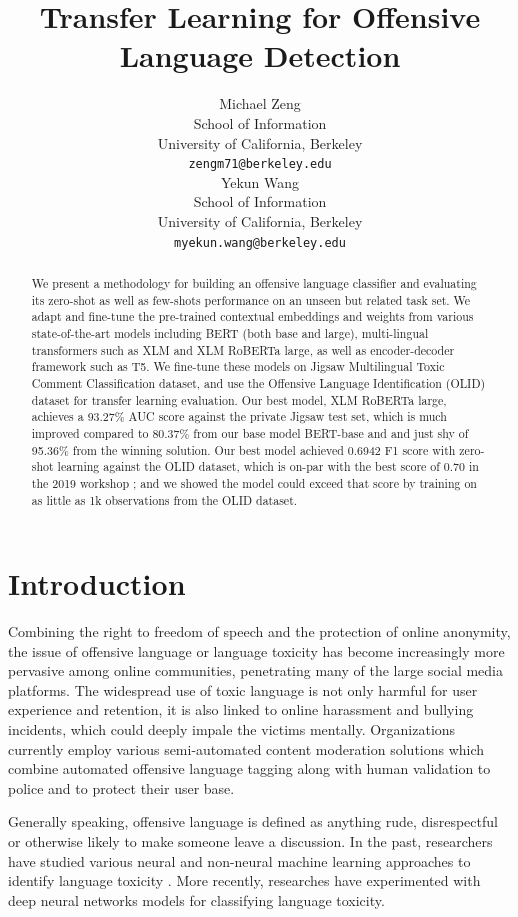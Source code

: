 \documentclass[11pt,a4paper]{article}
\title{Transfer Learning for Offensive Language Detection}
\author{Michael Zeng\\
  School of Information\\
  University of California, Berkeley \\
  {\tt zengm71@berkeley.edu} \\\And
  Yekun  Wang\\
  School of Information\\
  University of California, Berkeley \\
  {\tt myekun.wang@berkeley.edu} \\}
\date{}
\begin{document}
\maketitle
\begin{abstract}
We present a methodology for building an offensive language classifier and evaluating its zero-shot as well as few-shots performance on an unseen but related task set. We adapt and fine-tune the pre-trained contextual embeddings and weights from various state-of-the-art models including BERT (both base and large), multi-lingual transformers such as XLM and XLM RoBERTa large, as well as encoder-decoder framework such as T5. We fine-tune these models on Jigsaw Multilingual Toxic Comment Classification dataset, and use the Offensive Language Identification (OLID) dataset for transfer learning evaluation. Our best model, XLM RoBERTa large, achieves a 93.27\% AUC score against the private Jigsaw test set, which is much improved compared to 80.37\% from our base model BERT-base and and just shy of 95.36\% from the winning solution. Our best model achieved 0.6942 F1 score with zero-shot learning against the OLID dataset, which is on-par with the best score of 0.70 in the 2019 workshop \citep{zampieri-etal-2019-predicting}; and we showed the model could exceed that score by training on as little as 1k observations from the OLID dataset.

\end{abstract}

\section{Introduction}
Combining the right to freedom of speech and the protection of online anonymity, the issue of offensive language or language toxicity has become increasingly more pervasive among online communities, penetrating many of the large social media platforms. The widespread use of toxic language is not only harmful for user experience and retention, it is also linked to online harassment and bullying incidents, which could deeply impale the victims mentally. Organizations currently employ various semi-automated content moderation solutions which combine automated offensive language tagging along with human validation to police and to protect their user base. 

Generally speaking, offensive language is defined as anything rude, disrespectful or otherwise likely to make someone leave a discussion. In the past, researchers have studied various neural and non-neural machine learning approaches to identify language toxicity \citep{schmidt-wiegand-2017-survey}. More recently, researches have experimented with deep neural networks models for classifying language toxicity. 
\end{document}
